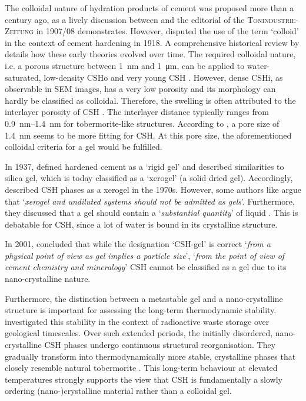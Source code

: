 The colloidal nature of hydration products of cement was proposed more than a century ago, as a lively discussion between \textcite{michaelis.1908} and the editorial of the \textsc{Tonindustrie-Zeitung} in 1907/08 demonstrates.
However, \textcite{chatelier.1918} disputed the use of the term `colloid' in the context of cement hardening in 1918.
A comprehensive historical review by \textcite{john.2023} details how these early theories evolved over time.
The required colloidal nature, i.e. a porous structure between \qty{1}{\nano\meter} and \qty{1}{\micro\meter}, can be applied to water-saturated, low-density \ac{CSHo} and very young \ac{CSH} \cite{sowoidnich.2023}.
However, dense \ac{CSHi}, as observable in \ac{SEM} images, has a very low porosity and its morphology can hardly be classified as colloidal.
Therefore, the swelling is often attributed to the interlayer porosity of \ac{CSH} \cite{jennings.2008}.
The interlayer distance typically ranges from \qtyrange{0.9}{1.4}{\nano\meter} for tobermorite-like structures.
According to \textcite{duque-redondo.2022}, a pore size of \qty{1.4}{\nano\meter} seems to be more fitting for \ac{CSH}.
At this pore size, the aforementioned colloidal criteria for a gel would be fulfilled.

In 1937, \textcite{lea.1937} defined hardened cement as a `rigid gel' and described similarities to silica gel, which is today classified as a `xerogel' (a solid dried gel).
Accordingly, \textcite{wittmann.1976,wittmann.1977} described \ac{CSH} phases as a xerogel in the 1970s.
However, some authors like \textcite{almdal.1993} argue that `\textit{xerogel and undiluted systems should not be admitted as gels}'.
Furthermore, they discussed that a gel should contain a `\textit{substantial quantity}' of liquid \cite{almdal.1993}.
This is debatable for \ac{CSH}, since a lot of water is bound in its crystalline structure.

In 2001, \textcite{stark.2001} concluded that while the designation `\ac{CSH}-gel' is correct `\textit{from a physical point of view as gel implies a particle size}', `\textit{from the point of view of cement chemistry and mineralogy}' \ac{CSH} cannot be classified as a gel due to its nano-crystalline nature.

Furthermore, the distinction between a metastable gel and a nano-crystalline structure is important for assessing the long-term thermodynamic stability.
\textcite{haeusler.2023} investigated this stability in the context of radioactive waste storage over geological timescales.
Over such extended periods, the initially disordered, nano-crystalline \ac{CSH} phases undergo continuous structural reorganisation.
They gradually transform into thermodynamically more stable, crystalline phases that closely resemble natural tobermorite \cite{haeusler.2023}.
This long-term behaviour at elevated temperatures strongly supports the view that \ac{CSH} is fundamentally a slowly ordering (nano-)crystalline material rather than a colloidal gel.


